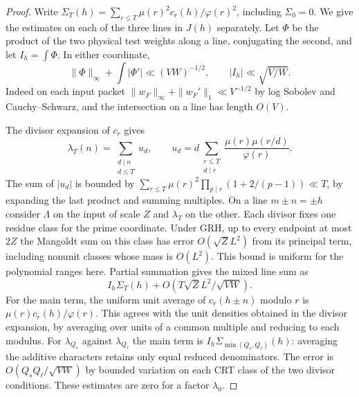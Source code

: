 \documentclass[11pt,a4paper]{article}
\numberwithin{equation}{section}
\begin{document}
\begin{proof}
Write $\Sigma_T(h)=\sum_{r\le T}\mu(r)^2 c_r(h)/\varphi(r)^2$,
including $\Sigma_0=0$. We give the estimates on each of the
three lines in $J(h)$ separately. Let $\Phi$ be the product
of the two physical test weights along a line, conjugating the
second, and let $I_h=\int\Phi$. In either coordinate,
\[
 \|\Phi\|_\infty+\int|\Phi'|\ll(VW)^{-1/2},
 \qquad |I_h|\ll\sqrt{V/W}.
\]
Indeed on each input packet $\|w_F\|_\infty+\|w_F'\|_1
\ll V^{-1/2}$ by log Sobolev and Cauchy--Schwarz, and the
intersection on a line has length $O(V)$.

The divisor expansion of $c_r$ gives
\[
 \lambda_T(n)=\sum_{\substack{d\mid n\\d\le T}}u_d,\qquad
 u_d=d\sum_{\substack{r\le T\\d\mid r}}
                   \frac{\mu(r)\mu(r/d)}{\varphi(r)} .
\]
The sum of $|u_d|$ is bounded by
$\sum_{r\le T}\mu(r)^2\prod_{p\mid r}(1+2/(p-1))\ll T$,
by expanding the last product and summing multiples.
On a line $m\pm n=\pm h$ consider $\Lambda$ on the input
of scale $Z$ and $\lambda_T$ on the other. Each divisor fixes
one residue class for the prime coordinate. Under GRH, up to
every endpoint at most $2Z$ the Mangoldt sum on this class
has error $O(\sqrt Z L^2)$ from its principal term, including
nonunit classes whose mass is $O(L^2)$. This bound is uniform
for the polynomial ranges here. Partial summation gives the
mixed line sum as
\[
 I_h\Sigma_T(h)+O(T\sqrt Z L^2/\sqrt{VW}).
\]
For the main term, the uniform unit average of $c_r(h\pm n)$
modulo $r$ is $\mu(r)c_r(h)/\varphi(r)$. This agrees with
the unit densities obtained in the divisor expansion, by
averaging over units of a common multiple and reducing to each
modulus. For $\lambda_{Q_s}$ against $\lambda_{Q_\ell}$ the
main term is $I_h\Sigma_{\min(Q_s,Q_\ell)}(h)$: averaging the
additive characters retains only equal reduced denominators.
The error is $O(Q_sQ_\ell/\sqrt{VW})$ by bounded variation
on each CRT class of the two divisor conditions. These
estimates are zero for a factor $\lambda_0$.


\end{proof}
\end{document}
